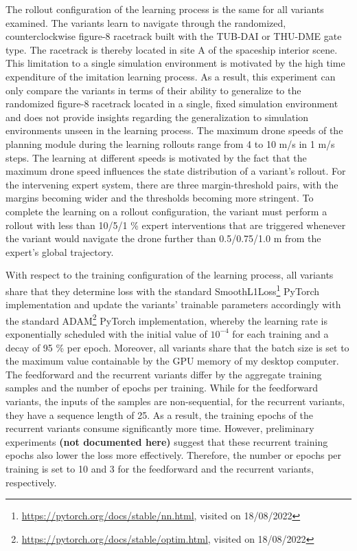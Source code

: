 The rollout configuration of the learning process
is the same for all variants examined.
The variants learn to navigate through 
the randomized, counterclockwise figure-8 racetrack
built with the TUB-DAI or THU-DME gate type.
The racetrack is thereby located in
site A of the spaceship interior scene.
This limitation to a single simulation environment
is motivated by the 
high time expenditure of the imitation learning process.
As a result,
this experiment can only compare the variants 
in terms of their ability to generalize 
to the randomized figure-8 racetrack
located in a single, fixed simulation environment
and does not provide insights 
regarding the generalization to simulation environments 
unseen in the learning process.
The maximum drone speeds of the planning module
during the learning rollouts
range from 4 to 10 m/s in 1 m/s steps.
The learning at different speeds is motivated
by the fact that the maximum drone speed 
influences the state distribution of a variant's rollout.
For the intervening expert system, 
there are three margin-threshold pairs, 
with the margins becoming wider 
and the thresholds becoming more stringent.
To complete the learning on a rollout configuration,
the variant must perform a rollout 
with less than 10/5/1 \% expert interventions
that are triggered whenever the variant
would navigate the drone further than 0.5/0.75/1.0 m
from the expert's global trajectory.

With respect to the training configuration of the learning process,
all variants share that they 
determine loss with
the standard 
SmoothL1Loss\footnote{\url{https://pytorch.org/docs/stable/nn.html}, visited on 18/08/2022}
PyTorch implementation
and update the variants' trainable parameters accordingly 
with the standard 
ADAM\footnote{\url{https://pytorch.org/docs/stable/optim.html}, visited on 18/08/2022}
PyTorch implementation,
whereby the learning rate is exponentially scheduled
with the initial value of $10^{-4}$ for each training and a decay of 
95 \% per epoch.
Moreover, all variants share that the batch size 
is set to the maximum value containable by
the GPU memory of my desktop computer.
The feedforward and the recurrent variants differ 
by the aggregate training samples
and the number of epochs per training.
While for the feedforward variants,
the inputs of the samples are non-sequential,
for the recurrent variants,
they have a sequence length of 25.
As a result, the training epochs of the
recurrent variants consume significantly more time.
However, preliminary experiments 
\textbf{(not documented here)}
suggest that these recurrent training epochs 
also lower the loss more effectively.
Therefore, the number or epochs per training
is set to 10 and 3 for the feedforward
and the recurrent variants, respectively.

